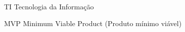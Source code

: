 \begin{siglas}
  \item[TI] Tecnologia da Informação
  \item[MVP] Minimum Viable Product (Produto mínimo viável)
\end{siglas}
